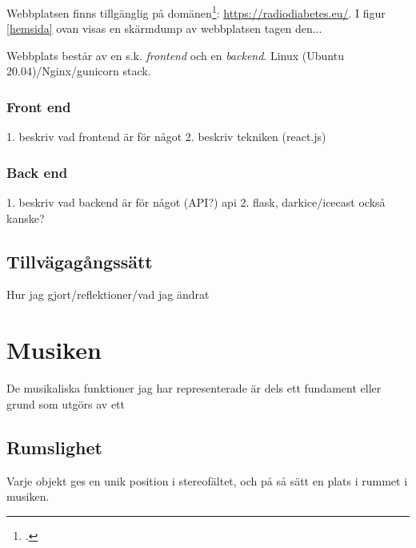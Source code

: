 \documentclass[11pt, a4paper]{article} %
\begin{document}
Webbplatsen finns tillgänglig på domänen\footcite{jondell_radio_nodate}: \url{https://radiodiabetes.eu/}. I figur \ref{hemsida} ovan visas en skärmdump av webbplatsen tagen den... %

Webbplats består av en s.k. \emph{\gls{frontend}} och en \emph{\gls{backend}}. Linux (Ubuntu 20.04)/Nginx/gunicorn \gls{stack}.
\subsubsection*{Front end}
1. beskriv vad frontend är för något
2. beskriv tekniken (react.js)

\subsubsection*{Back end}
1. beskriv vad backend är för något (API?) \gls{api}
2. flask, darkice/icecast också kanske? 

\subsection*{Tillvägagångssätt}
Hur jag gjort/reflektioner/vad jag ändrat

\section*{Musiken}



De musikaliska funktioner jag har representerade är dels ett fundament eller grund som utgörs av ett 


\subsection*{Rumslighet}
Varje objekt ges en unik position i stereofältet, och på så sätt en plats i rummet i musiken. 
\end{document}
